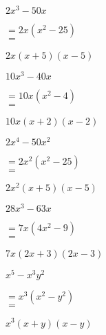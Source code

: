 \begin{tasks}
    \task \begin{exercise}$2x^3-50x$
              \begin{envSolution}
                 $ =2x(x^2-25)   $\\
                 $ =$			 
                     \begin{shortsolution}
  	                    $ 2x(x+5)(x-5)$
                     \end{shortsolution}
              \end{envSolution}%
          \end{exercise}
 
    \task \begin{exercise}$10x^3-40x$
              \begin{envSolution}
                 $ =10x(x^2-4)   $\\
                 $ = $				 
                     \begin{shortsolution}
  	                    $ 10x(x+2)(x-2)$
                     \end{shortsolution}
              \end{envSolution}%
          \end{exercise}
 
    \task \begin{exercise}$2x^4-50x^2$
              \begin{envSolution}
                 $ =2x^2(x^2-25)   $\\
                 $ = $				 
                     \begin{shortsolution}
  	                    $ 2x^2(x+5)(x-5)$
                     \end{shortsolution}
              \end{envSolution}%
          \end{exercise}

    \task \begin{exercise}$28x^3-63x$
              \begin{envSolution}
                 $ =7x(4x^2-9)   $\\
                 $ = $				 
                     \begin{shortsolution}
  	                    $ 7x(2x+3)(2x-3)$
                     \end{shortsolution}
              \end{envSolution}%
          \end{exercise}

    \task \begin{exercise}$x^5-x^3y^2$
              \begin{envSolution}
                 $ =x^3(x^2-y^2)   $\\
                 $ = $				 
                     \begin{shortsolution}
  	                    $ x^3(x+y)(x-y)$
                     \end{shortsolution}
              \end{envSolution}%
          \end{exercise}


\end{tasks}
